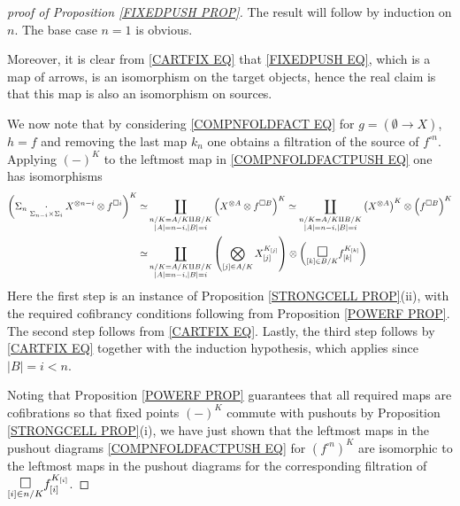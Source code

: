 \documentclass[a4paper,10pt
,draft
]{article}%
\numberwithin{equation}{section}
\numberwithin{figure}{section}
\theoremstyle{definition} %
\newcommand{\1}{\ensuremath{\mathbbm 1}}%
\begin{document}
\begin{proof}[proof of Proposition \ref{FIXEDPUSH PROP}]
The result will follow by induction on $n$. The base case $n=1$ is obvious.

Moreover, it is clear from \eqref{CARTFIX EQ} that \eqref{FIXEDPUSH EQ}, which is a map of arrows, is an isomorphism on the target objects, hence the real claim is that this map is also an isomorphism on sources.

We now note that by considering \eqref{COMPNFOLDFACT EQ} for
$g= (\emptyset \to X)$, $h=f$ and removing the last map $k_n$
one obtains a filtration of the source of $f^{\square n}$.
Applying $(\minus)^K$ to the leftmost map in 
\eqref{COMPNFOLDFACTPUSH EQ}
one has isomorphisms
\begin{align*}
	\left(
	\Sigma_n \underset{\Sigma_{n-i} \times \Sigma_i}
	{\cdot} X^{\otimes n-i} \otimes f^{\square i}
	\right)^K
\simeq &
	\coprod_{\substack{n/K=A/K \amalg B/K \\
	|A|=n-i,|B|=i}}
	\left( X^{\otimes A} \otimes f^{\square B} \right)^K
\simeq
	\coprod_{\substack{n/K=A/K \amalg B/K \\
	|A|=n-i,|B|=i}} 
	\left( X^{\otimes A}\right)^K \otimes \left( f^{\square B} \right)^K
\\
\simeq &
	\coprod_{\substack{n/K=A/K \amalg B/K \\
	|A|=n-i,|B|=i}} 
	\left(
	\bigotimes_{[j]\in A/K} X_{[j]}^{K_{[j]}}
	\right)
\otimes 
	\left(
	\underset{[k] \in B/K}
	{\mathlarger{\mathlarger{\square}}}
	f_{[k]}^{K_{[k]}}
	\right)
\end{align*}
Here the first step is an instance of Proposition \ref{STRONGCELL PROP}(ii),
with the required cofibrancy conditions following from Proposition \ref{POWERF PROP}. The second step follows from \eqref{CARTFIX EQ}.
Lastly, the third step follows by
\eqref{CARTFIX EQ} together with the induction hypothesis, which applies since $|B|=i<n$.

Noting that Proposition \ref{POWERF PROP} guarantees that all required maps are cofibrations
so that fixed points $(\minus)^K$ commute with pushouts by Proposition \ref{STRONGCELL PROP}(i),
we have just shown that 
the leftmost maps in the pushout diagrams \eqref{COMPNFOLDFACTPUSH EQ} for 
$\left( f^{\square n} \right)^K$
are isomorphic to the leftmost maps in the pushout diagrams for the corresponding filtration of 	
$\underset{[i] \in n/K}{\mathlarger{\mathlarger{\square}}}
 f_{[i]}^{K_{[i]}}$.
\end{proof}
\end{document}
